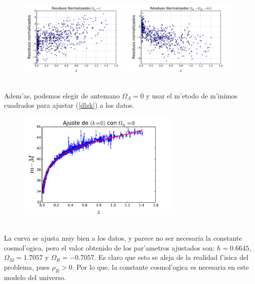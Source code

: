 \begin{figure}[h!]
  \centering
\includegraphics[width=0.49\textwidth]{fig/resparametros1.pdf}
\includegraphics[width=0.49\textwidth]{fig/resparametros3.pdf}
  \label{parametros2}
\end{figure}\\
Adem'as, podemos elegir de antemano $\Omega_\Lambda=0$ y usar el m'etodo de m'inimos cuadrados para ajustar (\ref{dlzk}) a los datos.  
\begin{figure}[h!]
  \centering
\includegraphics[width=0.70\textwidth]{fig/datos-y-ajustelambda0.pdf}
  \label{lambda0}
\end{figure}\\     
La curva se ajusta muy bien a los datos, y parece no ser necesaria la constante cosmol'ogica, pero el valor obtenido de los par'ametros ajustados son:
$h= 0.6645$, $\Omega_M=1.7057$ y $\Omega_R=-0.7057$. Es claro que esto se aleja de la realidad f'isica del problema, pues $\rho_R>0$.
Por lo que, la constante cosmol'ogica es necesaria en este modelo del universo.

